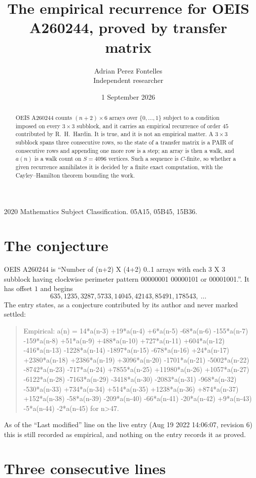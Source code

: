 \documentclass[11pt,a4paper]{article}
\title{The empirical recurrence for OEIS A260244, proved by transfer matrix}
\author{Adrian Perez Fontelles\\ \small Independent researcher}
\date{1 September 2026}
\theoremstyle{plain}
\theoremstyle{definition}
\begin{document}
\maketitle

\begin{abstract}
OEIS A260244 counts $(n+2)\times6$ arrays over $\{0,\dots,1\}$ subject to a condition imposed on
every $3\times3$ subblock, and it carries an empirical recurrence of order $45$
contributed by R.~H.~Hardin. It is true, and it is not an empirical matter. A $3\times3$
subblock spans three consecutive rows, so the state of a transfer matrix is a PAIR of
consecutive rows and appending one more row is a step; an array is then a walk, and
$a(n)$ is a walk count on $S=4096$ vertices. Such a sequence is $C$-finite, so whether a given
recurrence annihilates it is decided by a finite exact computation, with the Cayley--Hamilton
theorem bounding the work.
\end{abstract}

\noindent\small 2020 Mathematics Subject Classification. 05A15, 05B45, 15B36.\normalsize

\section{The conjecture}

OEIS A260244 is ``Number of (n+2) X (4+2) 0..1 arrays with each 3 X 3 subblock having clockwise perimeter pattern 00000001 00000101 or 00001001.''. It has offset $1$ and begins
\[
635, 1235, 3287, 5733, 14045, 42143, 85491, 178543,\ \dots
\]
The entry states, as a conjecture contributed by its author and never marked settled:
\begin{quote}
Empirical: a(n) = 14*a(n-3) +19*a(n-4) +6*a(n-5) -68*a(n-6) -155*a(n-7) -159*a(n-8) +51*a(n-9) +488*a(n-10) +727*a(n-11) +604*a(n-12) -416*a(n-13) -1228*a(n-14) -1897*a(n-15) -678*a(n-16) +24*a(n-17) +2380*a(n-18) +2386*a(n-19) +3096*a(n-20) -1701*a(n-21) -5002*a(n-22) -8742*a(n-23) -717*a(n-24) +7855*a(n-25) +11980*a(n-26) +1057*a(n-27) -6122*a(n-28) -7163*a(n-29) -3418*a(n-30) -2083*a(n-31) -968*a(n-32) -530*a(n-33) +734*a(n-34) +514*a(n-35) +1238*a(n-36) +874*a(n-37) +152*a(n-38) -58*a(n-39) -209*a(n-40) -66*a(n-41) -20*a(n-42) +9*a(n-43) -5*a(n-44) -2*a(n-45) for n>47.
\end{quote}
As of the ``Last modified'' line on the live entry (Aug 19 2022 14:06:07, revision 6) this is still
recorded as empirical, and nothing on the entry records it as proved.

\section{Three consecutive lines}
\end{document}
